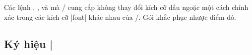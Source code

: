 \documentclass[11pt,leqno,titlepage,openany]{amsldoc}[1999/12/13]
\begin{document}
\medskip
Các lệnh , ,  và  mà \latex/ cung cấp
không thay đổi kích cỡ dấu ngoặc một cách chính xác trong các kích cỡ |font|
khác nhau của \latex/. Gói  khắc phục nhược điểm đó.

\subsection{Ký hiệu $\rvert$}
\end{document}

